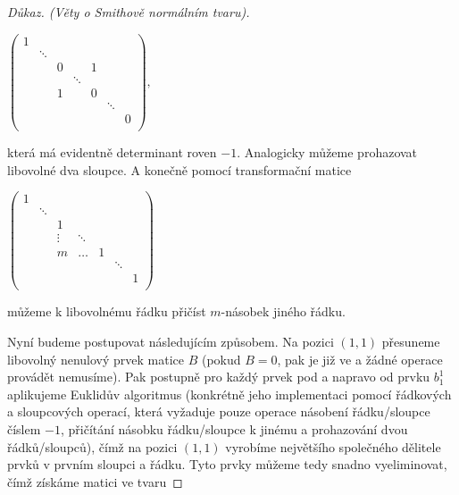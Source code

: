 \begin{proof}[Důkaz. (Věty o Smithově normálním tvaru)]
\begin{center}
$
    \begin{pmatrix}
        1       &        &        &        &        &        &        \\
                & \ddots &        &        &        &        &        \\
                &        & 0      &        & 1      &        &        \\
                &        &        & \ddots &        &        &        \\
                &        & 1      &        & 0      &        &        \\
                &        &        &        &        & \ddots &        \\
                &        &        &        &        &        & 0      \\
    \end{pmatrix},
$
\end{center}
která má evidentně determinant roven $ -1 $. Analogicky můžeme prohazovat
 libovolné dva sloupce. A konečně pomocí transformační matice
\begin{center}
$
    \begin{pmatrix}
        1       &        &        &        &        &        &        \\
                & \ddots &        &        &        &        &        \\
                &        & 1      &        &        &        &        \\
                &        & \vdots & \ddots &        &        &        \\
                &        & m      & \hdots & 1      &        &        \\
                &        &        &        &        & \ddots &        \\
                &        &        &        &        &        & 1      \\
    \end{pmatrix}
$
\end{center}
můžeme k libovolnému řádku přičíst $ m $-násobek jiného řádku.

Nyní budeme postupovat následujícím způsobem. Na pozici $ (1, 1) $ přesuneme libovolný
nenulový prvek matice $ B $ (pokud $ B = 0 $, pak je již ve \snf{} a žádné operace
provádět nemusíme). Pak postupně pro každý prvek pod a napravo od prvku $ b_1^1 $
aplikujeme Euklidův algoritmus (konkrétně jeho implementaci pomocí řádkových a
sloupcových operací, která vyžaduje pouze operace násobení řádku/sloupce číslem $ -1 $,
přičítání násobku řádku/sloupce k jinému a prohazování dvou řádků/sloupců),
čímž na pozici $ (1, 1) $ vyrobíme největšího společného dělitele prvků
v prvním sloupci a řádku. Tyto prvky můžeme tedy snadno vyeliminovat, čímž získáme
matici ve tvaru


\end{proof}
